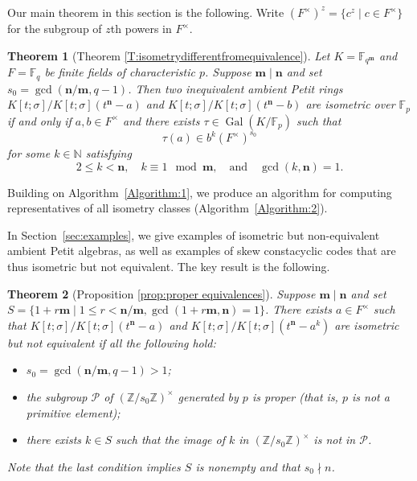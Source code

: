 \documentclass[11pt]{amsart}
\theoremstyle{plain}
\newtheorem*{theorem*}{Theorem}
\theoremstyle{definition}
\numberwithin{equation}{section}
\numberwithin{figure}{section}
\newcommand{\ZZ}{\mathbb{Z}}
\newcommand{\NN}{\mathbb{N}}
\newcommand{\FF}{\mathbb{F}}
\newcommand{\Kone}[1]{K[t;\sigma]/K[t;\sigma](t^{\de}-#1)}
\DeclareMathOperator{\id}{id}
\newcommand{\os}{{\mathbf{m}}}  %
\newcommand{\de}{{\mathbf{n}}}  %
\DeclareMathOperator{\Gal}{Gal}
\begin{document}
 Our main theorem in this section is the following.  Write $(F^\times)^z = \{c^z\mid c\in F^\times\}$ for the subgroup of $z$th powers in $F^\times$. %

\begin{theorem*}[Theorem \ref{T:isometrydifferentfromequivalence}]
Let $K=\FF_{q^\os}$ and $F=\FF_q$ be finite fields of characteristic $p$.
Suppose $\os\mid\de$ and set $s_0=\gcd(\de/\os,q-1)$.  Then two \emph{inequivalent} ambient Petit rings $K[t;\sigma]/K[t;\sigma](t^\de-a)$ and $K[t;\sigma]/K[t;\sigma](t^\de-b)$ are isometric over $\FF_p$  if and only if
     $a,b\in F^\times$ and
there exists $\tau \in \Gal(K/\FF_p)$ such that $$\tau(a)\in b^k (F^\times)^{s_0}$$
for some $k\in \NN$ satisfying $$
2\leq k <\de, \quad k\equiv 1 \mod \os, \quad \text{and} \quad \gcd(k,\de)=1.
$$
\end{theorem*}

Building on Algorithm~\ref{Algorithm:1}, we produce an algorithm for computing representatives of all isometry classes (Algorithm~\ref{Algorithm:2}).


In Section~\ref{sec:examples}, we give examples of isometric but non-equivalent ambient Petit algebras, as well as examples of skew constacyclic codes that are thus isometric but not equivalent.  The key result is the following.

\begin{theorem*}[Proposition \ref{prop:proper equivalences}]
    Suppose $\os\mid\de$ and set $S = \{ 1+r\os \mid 1\leq r < \de/\os, \gcd(1+r\os,\de)=1\}$.  There exists $a\in F^\times$ such that $\Kone{a}$ and $\Kone{a^k}$ are isometric but not equivalent if %
    all the following hold:
    \begin{itemize}
        \item $s_0=\gcd(\de/\os,q-1)>1$;
        \item the subgroup $\mathscr{P}$ of $(\ZZ/s_0\ZZ)^\times$ generated by $p$ is proper (that is, $p$ is not a primitive element);
        \item there exists $k\in S$ %
        such that the image of $k$ in $(\ZZ/s_0\ZZ)^\times$ is not in $\mathscr{P}$.
    \end{itemize}
    Note that the last condition implies $S$ is nonempty and that $s_0\nmid n$.
\end{theorem*}
\end{document}
